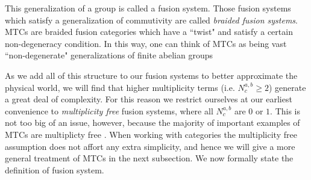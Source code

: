 \documentclass{article}
\theoremstyle{definition}
\numberwithin{figure}{section}
\begin{document}
This generalization of a group is called a fusion system. Those fusion systems which satisfy a generalization of commutivity are called \textit{braided fusion systems}. MTCs are braided fusion categories which have a ``twist" and satisfy a certain non-degeneracy condition. In this way, one can think of MTCs as being vast ``non-degenerate" generalizations of finite abelian groups

As we add all of this structure to our fusion systems to better approximate the physical world, we will find that higher multiplicity terms (i.e. $N^{a,b}_c\geq 2$) generate a great deal of complexity. For this reason we restrict ourselves at our earliest convenience to \textit{multiplicity free} fusion systems, where all $N^{a,b}_c$ are $0$ or $1$. This is not too big of an issue, however, because the majority of important examples of MTCs are multiplicty free \cite{barter2022computing}. When working with categories the multiplicity free assumption does not affort any extra simplicity, and hence we will give a more general treatment of MTCs in the next subsection. We now formally state the definition of fusion system.
\end{document}
